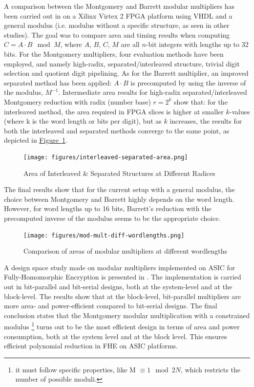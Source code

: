 \documentclass[11pt,
  titlepage=false,
  abstract=on,
]{scrreprt}
\begin{document}
A comparison between the Montgomery and Barrett modular multipliers has been carried out in \cite{kong2006comparison} on a Xilinx Virtex 2 FPGA platform using VHDL and a general modulus
(i.e. modulus without a specific structure, as seen in other studies).
The goal was to compare area and timing results when computing $C = A \cdot B \mod M$, where $A$, $B$, $C$, $M$ are all $n$-bit integers with lengths up to 32 bits.
For the Montgomery multipliers, four evaluation methods have been employed, and namely high-radix, separated/interleaved structure, trivial digit selection and quotient digit pipelining.
As for the Barrett multiplier, an improved separated method has been applied: $A \cdot B$ is precomputed by using the inverse of the modulus, $M^{-1}$.
Intermediate area results for high-radix separated/interleaved Montgomery reduction with radix (number base) $r = 2^{k}$ show that: for the interleaved  method, the area required in FPGA slices is higher
at smaller $k$-values (where k is the word length or bits per digit), but as $k$ increases, the results for both the interleaved and separated methods converge to the same point, as depicted in \hyperref[fig:interleaved-separated-area]{Figure~\ref{fig:interleaved-separated-area}}.

\begin{figure}[h]
  \centering
  \texttt{[image: figures/interleaved-separated-area.png]}
  \caption{Area of Interleaved \& Separated Structures at Different Radices \cite{kong2006comparison}}
  \label{fig:interleaved-separated-area}
\end{figure}

The final results show that  for the current setup with a general modulus, the choice between Montgomery and Barrett highly depends on the word length. However, for word lengths up to 16 bits,
Barrett's reduction with the precomputed inverse of the modulus seems to be the appropriate choice.

\begin{figure}[h]
  \centering
  \texttt{[image: figures/mod-mult-diff-wordlengths.png]}
  \caption{Comparison of areas of modular multipliers at different wordlengths \cite{kong2006comparison}}
  \label{fig:mod-mult-diff-wordlengths}
\end{figure}

A design space study made on modular multipliers implemented on ASIC for Fully-Homomorphic Encryption is presented in \cite{10129292}. The implementation is carried out in bit-parallel and bit-serial
designs, both at the system-level and at the block-level. The results show that at the block-level, bit-parallel multipliers are more area- and power-efficient compared to bit-serial designs.
The final conclusion states that the Montgomery modular multiplication with a constrained modulus \footnote{it must follow specific properties, like M $\equiv 1 \mod 2N$, which restricts the number of possible moduli.}  turns out to be the most efficient design in terms of area and power consumption, both at the system
level and at the block level. This ensures efficient polynomial reduction in FHE on ASIC platforms.
\end{document}
